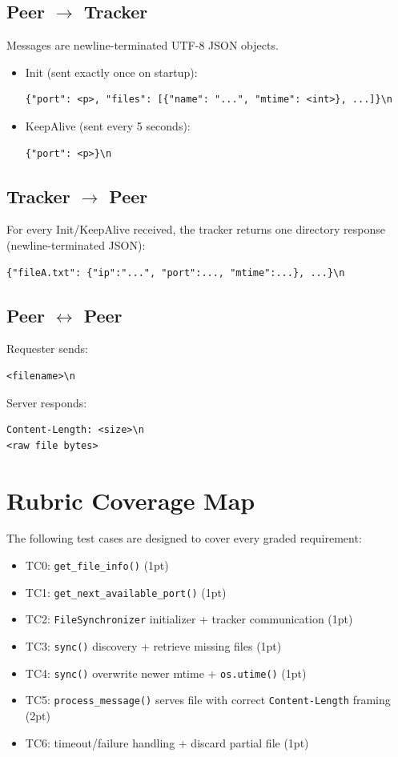 \documentclass[11pt]{article}
\begin{document}
\subsection{Peer $\rightarrow$ Tracker}
Messages are newline-terminated UTF-8 JSON objects.
\begin{itemize}[noitemsep]
  \item Init (sent exactly once on startup):
\begin{lstlisting}
{"port": <p>, "files": [{"name": "...", "mtime": <int>}, ...]}\n
\end{lstlisting}
  \item KeepAlive (sent every 5 seconds):
\begin{lstlisting}
{"port": <p>}\n
\end{lstlisting}
\end{itemize}

\subsection{Tracker $\rightarrow$ Peer}
For every Init/KeepAlive received, the tracker returns one directory response (newline-terminated JSON):
\begin{lstlisting}
{"fileA.txt": {"ip":"...", "port":..., "mtime":...}, ...}\n
\end{lstlisting}

\subsection{Peer $\leftrightarrow$ Peer}
Requester sends:
\begin{lstlisting}
<filename>\n
\end{lstlisting}
Server responds:
\begin{lstlisting}
Content-Length: <size>\n
<raw file bytes>
\end{lstlisting}

\section{Rubric Coverage Map}
The following test cases are designed to cover every graded requirement:
\begin{itemize}[noitemsep]
  \item TC0: \texttt{get\_file\_info()} (1pt)
  \item TC1: \texttt{get\_next\_available\_port()} (1pt)
  \item TC2: \texttt{FileSynchronizer} initializer + tracker communication (1pt)
  \item TC3: \texttt{sync()} discovery + retrieve missing files (1pt)
  \item TC4: \texttt{sync()} overwrite newer mtime + \texttt{os.utime()} (1pt)
  \item TC5: \texttt{process\_message()} serves file with correct \texttt{Content-Length} framing (2pt)
  \item TC6: timeout/failure handling + discard partial file (1pt)
\end{itemize}
\end{document}
